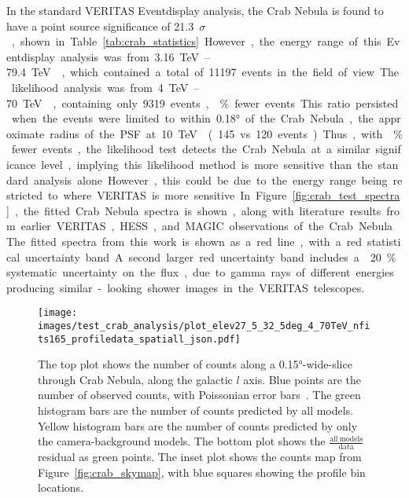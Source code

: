 In the standard VERITAS Eventdisplay analysis, the Crab Nebula is found to have a point source significance of \SI{21.3}{$\sigma$}, shown in Table~\ref{tab:crab_statistics}.
However, the energy range of this Eventdisplay analysis was from \SIrange{3.16}{79.4}{\TeV{}}, which contained a total of 11197 events in the field of view.
The likelihood analysis was from \SIrange{4}{70}{\TeV{}}, containing only 9319 events, \% fewer events.
This ratio persisted when the events were limited to within \ang{0.18} of the Crab Nebula, the approximate radius of the PSF at \SI{10}{\TeV{}} (145 vs 120 events).
Thus, with \% fewer events, the likelihood test detects the Crab Nebula at a similar significance level, implying this likelihood method is more sensitive than the standard analysis alone.
However, this could be due to the energy range being restricted to where VERITAS is more sensitive.

In Figure~\ref{fig:crab_test_spectra}, the fitted Crab Nebula spectra is shown, along with literature results from earlier VERITAS, HESS, and MAGIC observations of the Crab Nebula.
The fitted spectra from this work is shown as a red line, with a red statistical uncertainty band.
A second larger red uncertainty band includes a \nicetilde{}20\% systematic uncertainty on the flux, due to gamma rays of different energies producing similar-looking shower images in the VERITAS telescopes.

\begin{figure}[p]
  \centering
  \texttt{[image: images/test\_crab\_analysis/plot\_elev27\_5\_32\_5deg\_4\_70TeV\_nfits165\_profiledata\_spatiall\_json.pdf]}
  \caption[Crab Nebula Profile along Galactic $l$]
  {
    The top plot shows the number of counts along a \ang{0.15}-wide-slice through Crab Nebula, along the galactic $l$ axis.
    Blue points are the number of observed counts, with Poissonian error bars~\cite{poissonfrequentistinterval}.
    The green histogram bars are the number of counts predicted by all models.
    Yellow histogram bars are the number of counts predicted by only the camera-background models.
    The bottom plot shows the $\frac{\mathrm{all\:models}}{\mathrm{data}}$ residual as green points.
    The inset plot shows the counts map from Figure~\ref{fig:crab_skymap}, with blue squares showing the profile bin locations.
  }
  \label{fig:crab_profile_l}
\end{figure}

